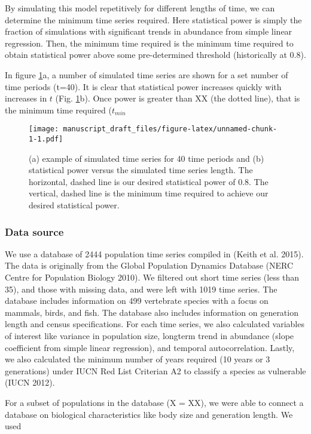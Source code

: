 \documentclass[12pt,]{article}
\begin{document}
By simulating this model repetitively for different lengths of time, we
can determine the minimum time series required. Here statistical power
is simply the fraction of simulations with significant trends in
abundance from simple linear regression. Then, the minimum time required
is the minimum time required to obtain statistical power above some
pre-determined threshold (historically at 0.8).

In figure \ref{fig:theoretical_approach}a, a number of simulated time
series are shown for a set number of time periods (t=40). It is clear
that statistical power increases quickly with increases in \(t\) (Fig.
\ref{fig:theoretical_approach}b). Once power is greater than XX (the
dotted line), that is the minimum time required (\(t_{min}\)

\begin{figure}[htbp]
\centering
\texttt{[image: manuscript\_draft\_files/figure-latex/unnamed-chunk-1-1.pdf]}
\caption{(a) example of simulated time series for 40 time periods and
(b) statistical power versus the simulated time series length. The
horizontal, dashed line is our desired statistical power of 0.8. The
vertical, dashed line is the minimum time required to achieve our
desired statistical power.\label{fig:theoretical_approach}}
\end{figure}

\subsubsection{Data source}\label{data-source}

We use a database of 2444 population time series compiled in (Keith et
al. 2015). The data is originally from the Global Population Dynamics
Database (NERC Centre for Population Biology 2010). We filtered out
short time series (less than 35), and those with missing data, and were
left with 1019 time series. The database includes information on 499
vertebrate species with a focus on mammals, birds, and fish. The
database also includes information on generation length and census
specifications. For each time series, we also calculated variables of
interest like variance in population size, longterm trend in abundance
(slope coefficient from simple linear regression), and temporal
autocorrelation. Lastly, we also calculated the minimum number of years
required (10 years or 3 generations) under IUCN Red List Criterian A2 to
classify a species as vulnerable (IUCN 2012).

For a subset of populations in the database (X = XX), we were able to
connect a database on biological characteristics like body size and
generation length. We used
\end{document}
